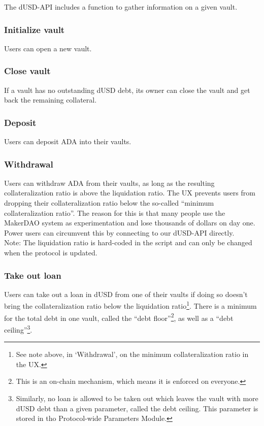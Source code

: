 \documentclass{article} %
\begin{document}
The dUSD-API includes a function to gather information on a given vault.

\subsubsection*{Initialize vault}

Users can open a new vault.

\subsubsection*{Close vault}

If a vault has no outstanding dUSD debt, its owner can close the vault and get
back the remaining collateral.

\subsubsection*{Deposit}

Users can deposit ADA into their vaults.

\subsubsection*{Withdrawal}

Users can withdraw ADA from their vaults, as long as the resulting
collateralization ratio is above the liquidation ratio. The UX prevents users
from dropping their collateralization ratio below the so-called ``minimum
collateralization ratio''. The reason for this is that many people use the
MakerDAO system as experimentation and lose thousands of dollars on day one.
Power users can circumvent this by connecting to our dUSD-API directly. \\

Note: The liquidation ratio is hard-coded in the script and can only be changed
when the protocol is updated.

\subsubsection*{Take out loan}

Users can take out a loan in dUSD from one of their vaults if doing so doesn't
bring the collateralization ratio below the liquidation ratio\footnote{
  See note above, in `Withdrawal', on the minimum collateralization ratio in the
  UX.}.
There is a minimum for the total debt in one vault, called the ``debt
floor''\footnote{
  This is an on-chain mechanism, which means it is enforced on everyone.
}, as well as a ``debt ceiling''\footnote{
  Similarly, no loan is allowed to be taken out which leaves the vault with more
dUSD debt than a given parameter, called the debt ceiling. This parameter is
stored in tho Protocol-wide Parameters Module.}.
\end{document}
